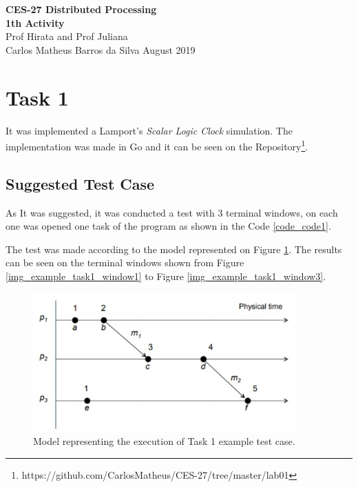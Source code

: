 \documentclass[a4paper, 11pt]{article}
\begin{document}
\noindent
\large\textbf{CES-27 Distributed Processing} \\
\textbf{1th Activity} \\
\normalsize Prof Hirata and Prof Juliana  \\
Carlos Matheus Barros da Silva \hfill August 2019

\section*{Task 1}

It was implemented a Lamport's \textit{Scalar Logic Clock} simulation. The implementation was made in Go and it can be seen on the Repository\footnote{https://github.com/CarlosMatheus/CES-27/tree/master/lab01}.

\subsection*{Suggested Test Case}

As It was suggested, it was conducted a test with 3 terminal windows, on each one was opened one task of the program as shown in the Code \ref{code_code1}.

The test was made according to the model represented on Figure \ref{img_task1}. The results can be seen on the terminal windows shown from Figure \ref{img_example_task1_window1} to Figure \ref{img_example_task1_window3}.

\begin{figure}[h]
  \begin{center}
  \includegraphics[width=4in]{./imgs/scalar.jpeg}
  \caption{Model representing the execution of Task 1 example test case.}
  \label{img_task1}
  \end{center}
\end{figure}


\end{document}
